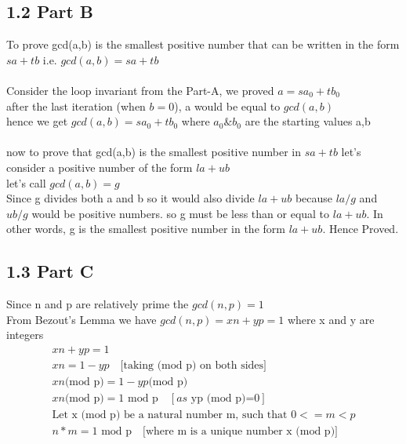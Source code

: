 \documentclass[12pt]{article}
\begin{document}
\subsection*{1.2 Part B} 

\vspace{10pt}

To prove gcd(a,b) is the smallest positive number that can be written in the form \(sa+tb\) i.e. \textbf{\(gcd(a,b)=sa+tb\)}
\\ \\
Consider the loop invariant from the Part-A, we proved \(a=sa_{0}+tb_{0}\) \\
after the last iteration (when \(b=0\)),  a would be equal to \(gcd(a,b)\) \\
hence we get \(gcd(a,b)=sa_{0}+tb_{0}\) where \(a_{0} \& b_{0}\) are the starting values a,b
\\ \\
now to prove that gcd(a,b) is the smallest positive number in \(sa+tb\) let's consider a positive number of the form \(la+ub\) \\
let's call \(gcd(a,b)=g\) \\
Since g divides both a and b so it would also divide \(la+ub\) because \(la/g\) and \(ub/g\) would be positive numbers. so g must be less than or equal to \(la+ub\). In other words, g is the smallest positive number in the form \(la+ub\). Hence Proved.

\subsection*{1.3 Part C}
\vspace{10pt}
Since n and p are relatively prime the \(gcd(n,p) = 1\) \\
From Bezout's Lemma we have \(gcd(n,p)=xn+yp = 1\) where x and y are integers
\begin{gather}
xn+yp = 1 \nonumber \\
xn = 1 - yp \quad \text{[taking (mod p) on both sides]} \nonumber \\
xn \text{(mod p)} = 1-yp \text{(mod p)} \nonumber \\
xn \text{(mod p)} = \text{1 mod p} \quad [as \text{ yp (mod p)=0}] \nonumber \\
\text{Let x (mod p) be a natural number m, such that } 0<=m<p \nonumber \\
n*m=\text{1 mod p} \quad \text{[where m is a unique number x (mod p)]}
\nonumber
\end{gather}
\end{document}
